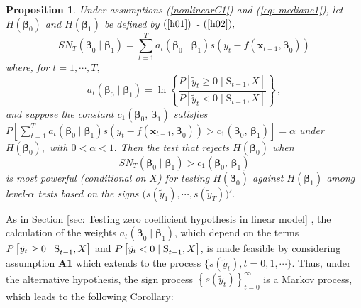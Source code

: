 \documentclass[harvard,11pt]{article}
\newtheorem{proposition}{Proposition}
\begin{document}
\begin{proposition}\label{proposition2C1}
Under assumptions (\ref{nonlinearC1}) and (\ref{eq: mediane1}), let $H(\bm{\beta}
_{0})$ and $H(\bm{\beta}_{1})$ be defined by $(\ref{h01})$ - $(\ref{h02}),$%
\begin{equation*}
SN_{T}(\bm{\beta}_{0}\mid\bm{\beta}_{1})=\sum\limits_{t=1}^{T}a_{t}(\bm{\beta}_{0}\mid\bm{\beta}
_{1})s\left( y_{t}-f(\bm{x}_{t-1},\bm{\beta}_{0})\right) 
\end{equation*}%
where, for $t=1,\cdots,T,$%
\begin{equation*}
a_{t}(\bm{\beta}_{0}\mid\bm{\beta}_{1})=\ln \left\{ \frac{P\left[ \tilde{y}%
_{t}\geq 0\mid \text{\~{S}}_{t-1},X\right] }{P\left[ \tilde{y}%
_{t}<0\mid \text{\~{S}}_{t-1},X\right] }\right\} \,,
\end{equation*}%
and suppose the constant $c_{1}(\bm{\beta} _{0},\,\bm{\beta}_{1})$ satisfies $%
P\left[ \sum\limits_{t=1}^{T}a_{t}(\bm{\beta}_{0}\mid\bm{\beta}_{1})s\left(
y_{t}-f(\bm{x}_{t-1},\bm{\beta}_{0})\right) >c_{1}(\bm{\beta}_{0},\,\bm{\beta}_{1})\right]
=\alpha $ under $H(\bm{\beta}_{0}),$ with $0<\alpha <1.$ Then the test that
rejects $H(\bm{\beta}_{0})$ when 
\begin{equation*}
SN_{T}(\bm{\beta}_{0}\mid\bm{\beta}_{1})>c_{1}(\bm{\beta}_{0},\,\bm{\beta}_{1})
\end{equation*}%
is most powerful (conditional on $X$) for testing $H(\bm{\beta}_{0})$ against $H(\bm{\beta}_{1})$ among
level-$\alpha $ tests based on the signs $\big(s(\tilde{y}_{1}),\cdots,s(\tilde{y}_{T})\big)'.$
\end{proposition}
\begin{sloppypar}
As in Section \ref{sec: Testing zero coefficient hypothesis in linear model}%
, the calculation of the weights $a_{t}(\bm{\beta}_{0}\mid\bm{\beta}_{1})$, which depend on the terms $P\left[ \tilde{y}_{t}\geq 0\mid \text{\b{S%
}}_{t-1},X\right] $ and $P\left[ \tilde{y}_{t}<0\mid \text{\b{S}}%
_{t-1},X\right] $, is made feasible by considering assumption \textbf{A1} which extends to the process $\{s(\tilde{y}_t),t=0,1,\cdots\}$. Thus, under the alternative hypothesis, the sign process $\left\{
s(\tilde{y}_{t})\right\} _{t=0}^{\infty }$ is a Markov process, which leads to the following Corollary:
\end{sloppypar}
\end{document}
